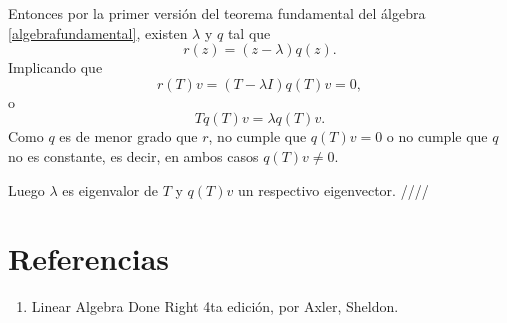 \documentclass{article}
\begin{document}
Entonces por la primer versión del teorema fundamental del
álgebra \ref{algebrafundamental}, existen
$\lambda$ y $q$ tal que
$$r(z) = (z-\lambda)q(z).$$
Implicando que
$$r(T)v = (T-\lambda I)q(T)v = 0,$$
o
$$Tq(T)v = \lambda q(T)v.$$
Como $q$ es de menor grado que $r$, no cumple que $q(T)v = 0$ o
no cumple que $q$ no es constante, es decir, en ambos casos
$q(T)v\neq 0$.

Luego $\lambda$ es
eigenvalor de $T$ y $q(T)v$ un respectivo eigenvector.
\hfill ////

\newpage
\section*{Referencias}
\begin{enumerate}
    \item Linear Algebra Done Right 4ta edición, por Axler, Sheldon.
\end{enumerate}
\end{document}
